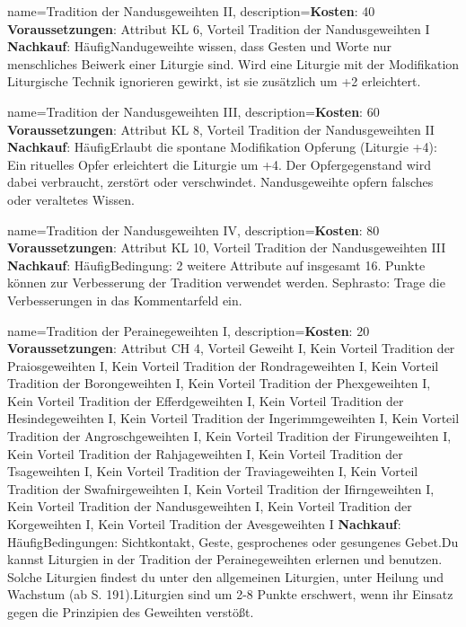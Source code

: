 {
    name={Tradition der Nandusgeweihten II},
    description={\textbf{Kosten}: 40 \textbf{Voraussetzungen}: Attribut KL 6, Vorteil Tradition der Nandusgeweihten I \textbf{Nachkauf}: Häufig\newline Nandugeweihte wissen, dass Gesten und Worte nur menschliches Beiwerk einer Liturgie sind. Wird eine Liturgie mit der Modifikation Liturgische Technik ignorieren gewirkt, ist sie zusätzlich um +2 erleichtert.}
}


{
    name={Tradition der Nandusgeweihten III},
    description={\textbf{Kosten}: 60 \textbf{Voraussetzungen}: Attribut KL 8, Vorteil Tradition der Nandusgeweihten II \textbf{Nachkauf}: Häufig\newline Erlaubt die spontane Modifikation Opferung (Liturgie +4): Ein rituelles Opfer erleichtert die Liturgie um +4. Der Opfergegenstand wird dabei verbraucht, zerstört oder verschwindet. Nandusgeweihte opfern falsches oder veraltetes Wissen.}
}


{
    name={Tradition der Nandusgeweihten IV},
    description={\textbf{Kosten}: 80 \textbf{Voraussetzungen}: Attribut KL 10, Vorteil Tradition der Nandusgeweihten III \textbf{Nachkauf}: Häufig\newline Bedingung: 2 weitere Attribute auf insgesamt 16. Punkte können zur Verbesserung der Tradition verwendet werden. Sephrasto: Trage die Verbesserungen in das Kommentarfeld ein.}
}


{
    name={Tradition der Perainegeweihten I},
    description={\textbf{Kosten}: 20 \textbf{Voraussetzungen}: Attribut CH 4, Vorteil Geweiht I, Kein Vorteil Tradition der Praiosgeweihten I, Kein Vorteil Tradition der Rondrageweihten I, Kein Vorteil Tradition der Borongeweihten I, Kein Vorteil Tradition der Phexgeweihten I, Kein Vorteil Tradition der Efferdgeweihten I, Kein Vorteil Tradition der Hesindegeweihten I, Kein Vorteil Tradition der Ingerimmgeweihten I, Kein Vorteil Tradition der Angroschgeweihten I, Kein Vorteil Tradition der Firungeweihten I, Kein Vorteil Tradition der Rahjageweihten I, Kein Vorteil Tradition der Tsageweihten I, Kein Vorteil Tradition der Traviageweihten I, Kein Vorteil Tradition der Swafnirgeweihten I, Kein Vorteil Tradition der Ifirngeweihten I, Kein Vorteil Tradition der Nandusgeweihten I, Kein Vorteil Tradition der Korgeweihten I, Kein Vorteil Tradition der Avesgeweihten I \textbf{Nachkauf}: Häufig\newline Bedingungen: Sichtkontakt, Geste, gesprochenes oder gesungenes Gebet.\newline Du kannst Liturgien in der Tradition der Perainegeweihten erlernen und benutzen. Solche Liturgien findest du unter den allgemeinen Liturgien, unter Heilung und Wachstum (ab S. 191).\newline Liturgien sind um 2-8 Punkte erschwert, wenn ihr Einsatz gegen die Prinzipien des Geweihten verstößt.}
}


